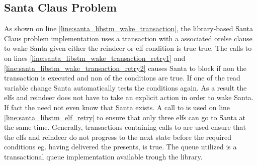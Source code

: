 \subsection{Santa Claus Problem}
As shown on line \ref{line:santa_libstm_wake_transaction}, the library-based Santa Claus problem implementation uses a transaction with a associated orelse clause to wake Santa given either the reindeer or elf condition is true true. The calls to  on lines \ref{line:santa_libstm_wake_transaction_retry1} and \ref{line:santa_libstm_wake_transaction_retry2} causes Santa to block if non the transaction is executed and non of the conditions are true. If one of the read variable change Santa automatically tests the conditions again. As a result the elfs and reindeer does not have to take an explicit action in order to wake Santa. If fact the need not even know that Santa exists. A call to  is used on line \ref{line:santa_libstm_elf_retry} to ensure that only three elfs can go to Santa at the same time. Generally, transactions containing calls to  are used ensure that the elfs and reindeer do not progress to the next state before the required conditions eg. having delivered the presents, is true. The queue utilized is a transactional queue implementation available trough the  library.
